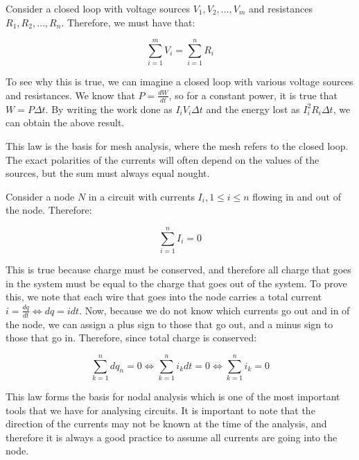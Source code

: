 \documentclass{article}
\begin{document}
\begin{proposition}
    Consider a closed loop with voltage sources $V_1, V_2, \dots, V_m$ and resistances $R_1, R_2, \dots, R_n$. Therefore, we must have that:

    \[ \sum_{i = 1}^m V_i = \sum_{i = 1}^n R_i \]
\end{proposition}

To see why this is true, we can imagine a closed loop with various voltage sources and resistances. We know that $P = \frac{dW}{dt}$, so for a constant power, it is true that $W = P\Delta t$. By writing the work done as $I_iV_i\Delta t$ and the energy lost as $I_i^2R_i\Delta t$, we can obtain the above result.

This law is the basis for mesh analysis, where the mesh refers to the closed loop. The exact polarities of the currents will often depend on the values of the sources, but the sum must always equal nought.

\begin{proposition}
    Consider a node $N$ in a circuit with currents $I_i, 1 \leq i \leq n$ flowing in and out of the node. Therefore:

    \[ \sum_{i = 1}^n I_i = 0 \]
\end{proposition}

This is true because charge must be conserved, and therefore all charge that goes in the system must be equal to the charge that goes out of the system. To prove this, we note that each wire that goes into the node carries a total current $i = \frac{dq}{dt} \iff dq = idt$. Now, because we do not know which currents go out and in of the node, we can assign a plus sign to those that go out, and a minus sign to those that go in. Therefore, since total charge is conserved:

\[ \sum_{k = 1}^n dq_n = 0 \iff \sum_{k = 1}^n i_kdt = 0 \iff \sum_{k = 1}^n i_k = 0 \]

This law forms the basis for nodal analysis which is one of the most important tools that we have for analysing circuits. It is important to note that the direction of the currents may not be known at the time of the analysis, and therefore it is always a good practice to assume all currents are going into the node.
\end{document}
